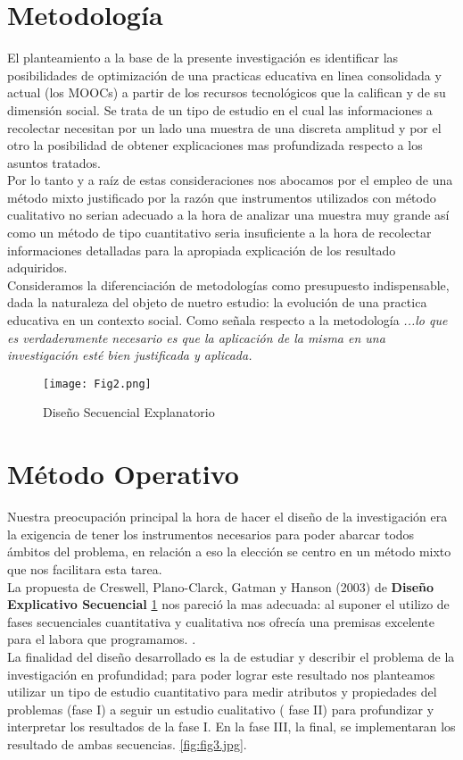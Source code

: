 \documentclass[11pt]{article}
\begin{document}
\begin{description}
\section{Metodología}
El planteamiento a la base de la presente investigación es identificar las posibilidades de optimización de una practicas educativa en linea consolidada y actual (los MOOCs) a partir de los recursos tecnológicos que la califican y de su dimensión social. Se trata de un tipo de estudio en el cual las informaciones a recolectar necesitan por un lado una muestra de una discreta amplitud y por el otro la posibilidad de obtener explicaciones mas profundizada respecto a los asuntos tratados.
\\Por lo tanto y a raíz de estas consideraciones nos abocamos por el empleo de una método mixto justificado por la razón que instrumentos utilizados con método cualitativo no serian adecuado a la hora de analizar una muestra muy grande así como un método de tipo cuantitativo seria insuficiente a la hora de recolectar informaciones detalladas para la apropiada explicación de los resultado adquiridos\citep{Cpc11}.
\\Consideramos la diferenciación de metodologías como presupuesto indispensable, dada la naturaleza del objeto de nuetro estudio: la evolución de una practica educativa en un contexto social. Como señala \citep{CaberoAlmenara2016} respecto a la metodología \textit{...lo que es verdaderamente necesario es que la aplicación de la misma en una investigación esté bien justificada y aplicada.}
\vspace{10pt}

 \begin{figure}[ht]\centering
\texttt{[image: Fig2.png]}
\caption{Diseño Secuencial Explanatorio}
\label{fig:fig.png}
\end{figure}
\section{Método Operativo}

Nuestra preocupación principal la hora de hacer el diseño de la investigación era la exigencia de tener los instrumentos necesarios para poder abarcar todos ámbitos del problema, en relación a eso la elección se centro en un método mixto que nos facilitara esta tarea.
\\La propuesta de Creswell, Plano-Clarck, Gatman y Hanson (2003) de \textbf{Diseño Explicativo Secuencial} \ref{fig:fig.png} nos pareció la mas adecuada: al suponer el utilizo de fases secuenciales cuantitativa y cualitativa nos ofrecía una premisas excelente para el labora que programamos.   \citep{Ivankova2006}. 
\\La finalidad del diseño desarrollado es la de estudiar y describir el problema de la investigación en profundidad; para poder lograr este resultado nos planteamos utilizar un tipo de estudio cuantitativo para medir atributos y propiedades del problemas (fase I) a seguir un estudio cualitativo ( fase II) para profundizar y interpretar los resultados de la fase I. En la fase III, la final, se implementaran los resultado de ambas secuencias. \ref{fig:fig3.jpg}.


\end{description}
\end{document}
